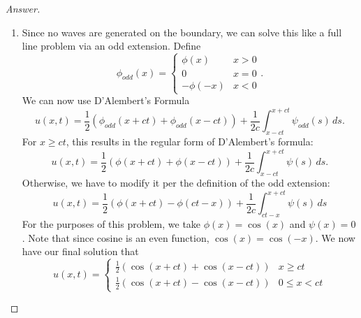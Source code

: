 \documentclass{article}
\theoremstyle{definition}
\renewcommand\qedsymbol{$\blacksquare$}
\newenvironment{ans}{\begin{proof}[Answer]\renewcommand{\qedsymbol}{}}{\end{proof}}
\begin{document}
\begin{ans}
\begin{enumerate}[(1), start=9]
    \item Since no waves are generated on the boundary, we can solve this like a full line problem via an odd extension. Define
    \[\phi_{odd}(x) = \begin{cases}
        \phi(x) & x > 0\\
        0 & x = 0\\
        -\phi(-x) & x < 0
    \end{cases}.\]
    We can now use D'Alembert's Formula
    \[u(x,t) = \frac{1}{2}(\phi_{odd}(x+ct) + \phi_{odd}(x-ct)) + \frac{1}{2c}\int_{x-ct}^{x+ct}\psi_{odd}(s)\,ds.\]
    For $x \geq ct$, this results in the regular form of D'Alembert's formula:
    \[u(x,t) = \frac{1}{2}(\phi(x+ct) + \phi(x-ct)) + \frac{1}{2c}\int_{x-ct}^{x+ct}\psi(s)\,ds.\]
    Otherwise, we have to modify it per the definition of the odd extension:
    \[u(x,t) = \frac{1}{2}(\phi(x+ct) - \phi(ct-x)) + \frac{1}{2c}\int_{ct-x}^{x+ct}\psi(s)\,ds\]
    For the purposes of this problem, we take $\phi(x) = \cos(x)$ and $\psi(x) = 0$. Note that since cosine is an even function, $\cos(x) = \cos(-x)$. We now have our final solution that
    \[\boxed{u(x,t) = \begin{cases}
        \frac{1}{2}(\cos(x+ct) + \cos(x-ct)) & x \geq ct\\
        \frac{1}{2}(\cos(x+ct) - \cos(x-ct)) & 0 \leq x < ct
    \end{cases}}\]


\end{enumerate}
\end{ans}
\end{document}
